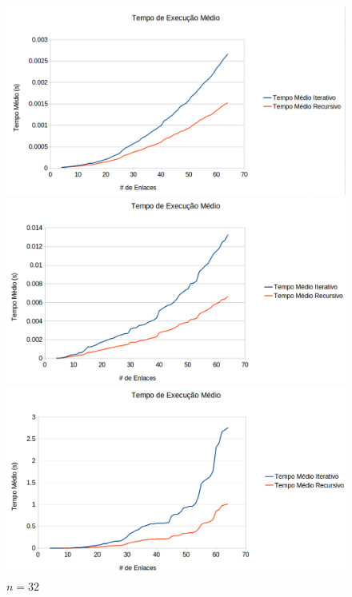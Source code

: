 \begin{figure}[ht] 
  \label{fig:tempo} 
  \begin{minipage}[b]{0.5\linewidth}
    \centering
    \includegraphics[width=1\linewidth]{figs/tempo16.png} 
    \caption{$n=16$} 
    \vspace{4ex}
  \end{minipage}%
  \begin{minipage}[b]{0.5\linewidth}
    \centering
    \includegraphics[width=1\linewidth]{figs/tempo32.png} 
    \caption{$n=32$} 
    \vspace{4ex}
  \end{minipage} 
  \begin{minipage}[b]{0.5\linewidth}
    \centering
    \includegraphics[width=1\linewidth]{figs/tempo64.png} 

\end{minipage}
\end{figure}
